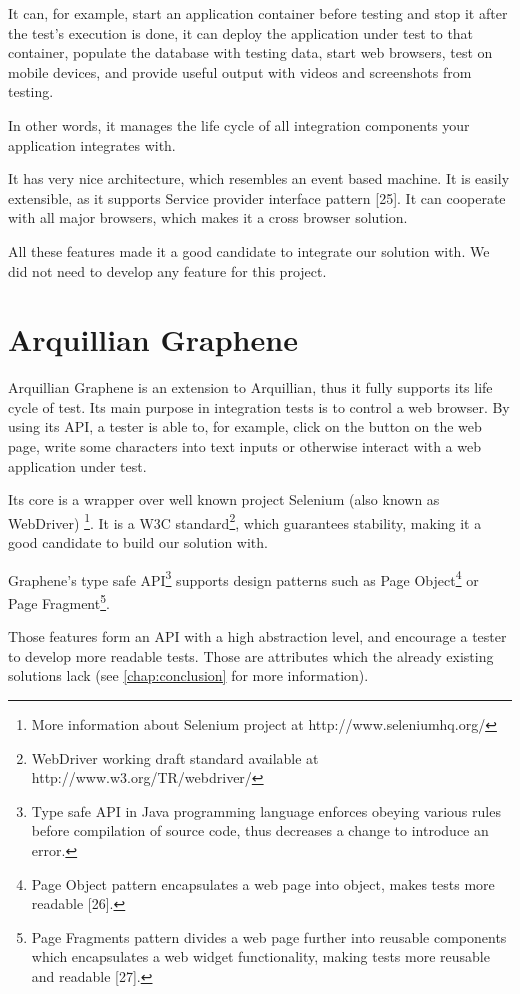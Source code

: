 \documentclass[11pt,oneside,final]{fithesis2}
\begin{document}
It can, for example, start an application container before testing and stop it after the test's execution 
is done, it can deploy the application under test to that container, populate the database with testing data, 
start web browsers, test on mobile devices, and provide useful output with videos and screenshots 
from testing.

In other words, it manages the life cycle of all integration components your application integrates with.

It has very nice architecture, which resembles an event based machine. It is easily extensible, as it
supports Service provider interface pattern [25]. It can cooperate with all major browsers, which makes
it a cross browser solution. 

All these features made it a good candidate to integrate our solution with. We did not need to develop any
feature for this project.
  
\section{Arquillian Graphene}
Arquillian Graphene is an extension to Arquillian, thus it fully supports its life cycle of test. Its main
purpose in integration tests is to control a web browser. By using its API, a tester is able to, for example,
click on the button on the web page, write some characters into text inputs or otherwise interact with
a web application under test.

Its core is a wrapper over well known project Selenium (also known as WebDriver) 
\footnote{More information about Selenium project at http://www.seleniumhq.org/}. It is a W3C 
standard\footnote{WebDriver working draft standard available at http://www.w3.org/TR/webdriver/},
which guarantees stability, making it a good candidate to build our solution with.

Graphene's type safe API\footnote{Type safe API in Java programming language enforces obeying various rules
before compilation of source code, thus decreases a change to introduce an error.} supports design patterns
such as Page Object\footnote{Page Object pattern encapsulates a web page into object, makes tests
more readable [26].} or Page Fragment\footnote{Page Fragments pattern divides a web page further into reusable 
components which encapsulates a web widget functionality, making tests more reusable and readable [27].}.

Those features form an API with a high abstraction level, and encourage a tester to develop more readable
tests. Those are attributes which the already existing solutions lack (see \ref{chap:conclusion} for more
information).
\end{document}
